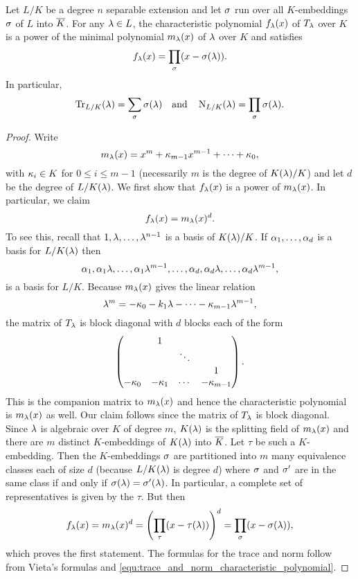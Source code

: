    \begin{proposition}\label{prop:formulas_for_trace_and_norm}
      Let $L/K$ be a degree $n$ separable extension and let $\sigma$ run over all $K$-embeddings $\sigma$ of $L$ into $\overline{K}$. For any $\lambda \in L$, the characteristic polynomial $f_{\lambda}(x)$ of $T_{\lambda}$ over $K$ is a power of the minimal polynomial $m_{\lambda}(x)$ of $\lambda$ over $K$ and satisfies
      \[
        f_{\lambda}(x) = \prod_{\sigma}(x-\sigma(\lambda)).
      \]
      In particular,
      \[
        \operatorname{\mathrm{Tr}}_{L/K}(\lambda) = \sum_{\sigma}\sigma(\lambda) \quad \text{and} \quad \operatorname{\mathrm{N}}_{L/K}(\lambda) = \prod_{\sigma}\sigma(\lambda).
      \]
    \end{proposition}
    \begin{proof}
      Write
      \[
        m_{\lambda}(x) = x^{m}+\kappa_{m-1}x^{m-1}+\cdots+\kappa_{0},
      \]
      with $\kappa_{i} \in K$ for $0 \le i \le m-1$ (necessarily $m$ is the degree of $K(\lambda)/K$) and let $d$ be the degree of $L/K(\lambda)$. We first show that $f_{\lambda}(x)$ is a power of $m_{\lambda}(x)$. In particular, we claim
      \[
        f_{\lambda}(x) = m_{\lambda}(x)^{d}.
      \]
      To see this, recall that $1,\lambda,\ldots,\lambda^{n-1}$ is a basis of $K(\lambda)/K$. If $\alpha_{1},\ldots,\alpha_{d}$ is a basis for $L/K(\lambda)$ then
      \[
        \alpha_{1},\alpha_{1}\lambda,\ldots,\alpha_{1}\lambda^{m-1},\ldots,\alpha_{d},\alpha_{d}\lambda,\ldots,\alpha_{d}\lambda^{m-1},
      \]
      is a basis for $L/K$. Because $m_{\lambda}(x)$ gives the linear relation
      \[
        \lambda^{m} = -\kappa_{0}-k_{1}\lambda-\cdots-\kappa_{m-1}\lambda^{m-1},
      \]
      the matrix of $T_{\lambda}$ is block diagonal with $d$ blocks each of the form
      \[
        \begin{pmatrix} & 1 & & \\ & & \ddots & \\ & & & 1 \\ -\kappa_{0} & -\kappa_{1} & \cdots & -\kappa_{m-1} \\ \end{pmatrix}.
      \]
      This is the companion matrix to $m_{\lambda}(x)$ and hence the characteristic polynomial is $m_{\lambda}(x)$ as well. Our claim follows since the matrix of $T_{\lambda}$ is block diagonal. Since $\lambda$ is algebraic over $K$ of degree $m$, $K(\lambda)$ is the splitting field of $m_{\lambda}(x)$ and there are $m$ distinct $K$-embeddings of $K(\lambda)$ into $\overline{K}$. Let $\tau$ be such a $K$-embedding. Then the $K$-embeddings $\sigma$ are partitioned into $m$ many equivalence classes each of size $d$ (because $L/K(\lambda)$ is degree $d$) where $\sigma$ and $\sigma'$ are in the same class if and only if $\sigma(\lambda) = \sigma'(\lambda)$. In particular, a complete set of representatives is given by the $\tau$. But then
      \[
        f_{\lambda}(x) = m_{\lambda}(x)^{d} = \left(\prod_{\tau}(x-\tau(\lambda))\right)^{d} = \prod_{\sigma}(x-\sigma(\lambda)),
      \]
      which proves the first statement. The formulas for the trace and norm follow from Vieta's formulas and \cref{equ:trace_and_norm_characteristic_polynomial}.
    \end{proof}

